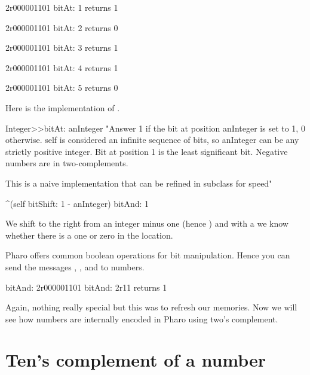 \documentclass[a4paper,10pt,twoside]{book}
\begin{document}
\begin{code}{}
2r000001101 bitAt: 1
	returns 1 
	
2r000001101 bitAt: 2
	returns 0 
			
2r000001101 bitAt: 3
	returns 1
	
2r000001101 bitAt: 4
	returns 1
	 
2r000001101 bitAt: 5
	returns 0 	 
\end{code}

Here is the implementation of . 

\begin{code}{}
Integer>>bitAt: anInteger
	"Answer 1 if the bit at position anInteger is set to 1, 0 otherwise.
	self is considered an infinite sequence of bits, so anInteger can be any strictly positive integer.
	Bit at position 1 is the least significant bit.
	Negative numbers are in two-complements.
	
	This is a naive implementation that can be refined in subclass for speed"
	
	^(self bitShift: 1 - anInteger) bitAnd: 1
\end{code}

We shift to the right from an integer minus one (hence )
and with a  we know whether there is a one or zero in the location.



Pharo offers common boolean operations for bit manipulation. Hence you can send the messages , , and  to numbers. 

\begin{code}{bitAnd:}
2r000001101 bitAnd: 2r11
	returns 1 
\end{code}

Again, nothing really special but this was to refresh our memories. Now we will see how numbers are internally encoded in Pharo using two's complement. 

\section{Ten's complement of a number}
\end{document}
